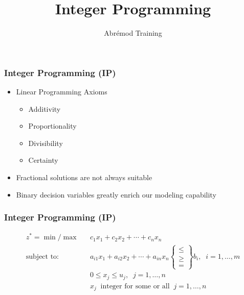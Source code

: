 \documentclass[12pt,handout]{beamer}
\title{Integer Programming}
\author{Abr\'emod Training}
\begin{document}

\begin{frame}
\titlepage
\end{frame}

\begin{frame}
\frametitle{Integer Programming (IP)}
\begin{itemize}
\item Linear Programming Axioms
\begin{itemize}
\item Additivity
\item Proportionality
\item {\color{red} Divisibility}
\item Certainty
\end{itemize}
\item Fractional solutions are not always suitable
\item Binary decision variables greatly enrich our modeling capability
\end{itemize}
\end{frame}

\begin{frame}
\frametitle{Integer Programming (IP)}
\begin{eqnarray}
z^* = \min / \max && c_1 x_1 + c_2 x_2 + \cdots + c_n x_n \nonumber \\
\mbox{subject to:} &&a_{i1} x_1 + a_{i2} x_2 + \cdots + a_{in} x_n
\begin{Bmatrix}   \le \\
                   \ge \\
                    =
\end{Bmatrix}
b_i,\;\;i = 1,\ldots,m \nonumber \\
&&0 \le x_j \le u_j,\;\;j = 1,\ldots,n \nonumber \\
&&x_j \;\;\mbox{integer for some or all}\;\; j = 1,\ldots,n \nonumber
\end{eqnarray}
\end{frame}
\end{document}
